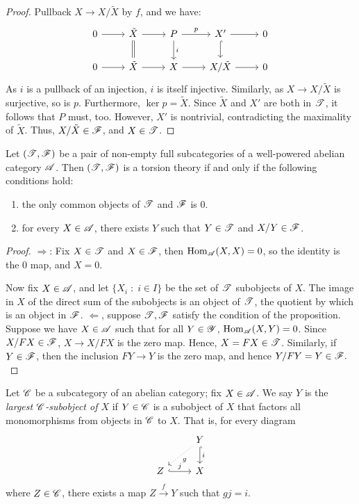 \begin{proof}
Pullback $X \to X/\tilde{X}$ by $f$, and we have:
\[
\begin{tikzcd}
0 \arrow{r} &
\tilde{X} \arrow{r}\arrow[equals]{d} &
P \arrow{r}{p} \arrow{d}{i} &
X' \arrow{r} \arrow[hook]{d} &
0 \\
0 \arrow{r} &
\tilde{X} \arrow{r} &
X \arrow{r} &
X/\tilde{X} \arrow{r} &
0
\end{tikzcd}
\]
As $i$ is a pullback of an injection, $i$ is itself injective.
Similarly, as $X \to X/\tilde{X}$ is surjective, so is $p$.
Furthermore, $\ker p = \tilde{X}$. Since $\tilde{X}$ and $X'$
are both in $\mathscr{T}$, it follows that $P$ must, too. However,
$X'$ is nontrivial, contradicting the maximality of $\tilde{X}$.
Thus, $X/\tilde{X} \in \mathscr{F}$, and $X \in \mathscr{T}$.
\end{proof}

\begin{prop}\label{prop_tt_suff_cond}
Let $(\mathscr{T}, \mathscr{F})$ be a pair of non-empty full subcategories
of a well-powered abelian category $\mathscr{A}$. Then $(\mathscr{T}, 
\mathscr{F})$ is a torsion theory if and only if the following 
conditions hold:
\begin{enumerate}
\item the only common objects of $\mathscr{T}$ and $\mathscr{F}$ is 0.

\item for every $X \in \mathscr{A}$, there exists $Y$ such that $Y \in 
\mathscr{T}$ and $X/Y \in \mathscr{F}$.
\end{enumerate}
\end{prop}
\begin{proof}
\noindent $\Rightarrow$: Fix $X \in \mathscr{T}$ and $X \in \mathscr{F}$, 
then $\mathrm{Hom}_{\mathscr{A}}(X,X) = 0$, so the identity is the 0 map, and
$X = 0$.

Now fix $X \in \mathscr{A}$, and let $\{X_i\;:\;i \in I\}$ be the set
of $\mathscr{T}$ subobjects of $X$. The image in $X$ of the direct 
sum of the subobjects is an object of $\mathscr{T}$, the quotient by 
which is an object in $\mathscr{F}$.
\vskip 10pt
\noindent $\Leftarrow$, suppose $\mathscr{T}, \mathscr{F}$ satisfy the 
condition of the proposition. Suppose we have $X \in \mathscr{A}$ such 
that for all $Y \in \mathscr{Y}$, $\mathrm{Hom}_{\mathscr{A}}(X, Y) = 0$.
Since $X/FX \in \mathscr{F}$, $X \to X/FX$ is the zero map. Hence, $X 
= FX \in \mathscr{T}$. Similarly, if $Y \in \mathscr{F}$, then the 
inclusion $FY \to Y$ is the zero map, and hence $Y/FY = Y \in 
\mathscr{F}.$
\end{proof}

\begin{defn}
Let $\mathscr{C}$ be a subcategory of an abelian category; fix $X \in
\mathscr{A}$. We say $Y$ is the \emph{largest $\mathscr{C}$-subobject of 
$X$} if $Y \in \mathscr{C}$ is a subobject of $X$ that factors all 
monomorphisms from objects in $\mathscr{C}$ to $X$. That is, for 
every diagram
\[
\begin{tikzcd}
{} &
Y \arrow[hook]{d}{i} \arrow[dotted]{ld}{g} \\
Z \arrow[hook]{r}{j} & X
\end{tikzcd}
\]
where $Z \in \mathscr{C}$, there exists a map $Z \stackrel{f}{\to} Y$ 
such that $gj = i$.
\end{defn}


